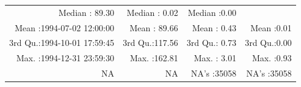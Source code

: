 \documentclass[
  10pt,
  a4paper,oneside]{article}
\begin{document}
\begin{longtable}[]{@{}rrrr@{}}
\begin{minipage}[t]{0.19\columnwidth}
Median : 89.30\strut
\end{minipage} & \begin{minipage}[t]{0.18\columnwidth}\raggedleft
Median : 0.02\strut
\end{minipage} & \begin{minipage}[t]{0.18\columnwidth}\raggedleft
Median :0.00\strut
\end{minipage}\tabularnewline
\begin{minipage}[t]{0.34\columnwidth}\raggedleft
Mean :1994-07-02 12:00:00\strut
\end{minipage} & \begin{minipage}[t]{0.19\columnwidth}\raggedleft
Mean : 89.66\strut
\end{minipage} & \begin{minipage}[t]{0.18\columnwidth}\raggedleft
Mean : 0.43\strut
\end{minipage} & \begin{minipage}[t]{0.18\columnwidth}\raggedleft
Mean :0.01\strut
\end{minipage}\tabularnewline
\begin{minipage}[t]{0.34\columnwidth}\raggedleft
3rd Qu.:1994-10-01 17:59:45\strut
\end{minipage} & \begin{minipage}[t]{0.19\columnwidth}\raggedleft
3rd Qu.:117.56\strut
\end{minipage} & \begin{minipage}[t]{0.18\columnwidth}\raggedleft
3rd Qu.: 0.73\strut
\end{minipage} & \begin{minipage}[t]{0.18\columnwidth}\raggedleft
3rd Qu.:0.00\strut
\end{minipage}\tabularnewline
\begin{minipage}[t]{0.34\columnwidth}\raggedleft
Max. :1994-12-31 23:59:30\strut
\end{minipage} & \begin{minipage}[t]{0.19\columnwidth}\raggedleft
Max. :162.81\strut
\end{minipage} & \begin{minipage}[t]{0.18\columnwidth}\raggedleft
Max. : 3.01\strut
\end{minipage} & \begin{minipage}[t]{0.18\columnwidth}\raggedleft
Max. :0.93\strut
\end{minipage}\tabularnewline
\begin{minipage}[t]{0.34\columnwidth}\raggedleft
NA\strut
\end{minipage} & \begin{minipage}[t]{0.19\columnwidth}\raggedleft
NA\strut
\end{minipage} & \begin{minipage}[t]{0.18\columnwidth}\raggedleft
NA's :35058\strut
\end{minipage} & \begin{minipage}[t]{0.18\columnwidth}\raggedleft
NA's :35058\strut
\end{minipage}\tabularnewline
\bottomrule
\end{longtable}
\end{document}
